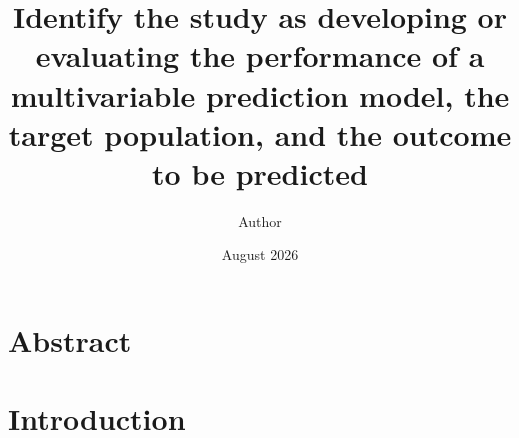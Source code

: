 \documentclass{article}
\title{Identify the study as developing or evaluating the performance of a multivariable prediction model, the target population, and the outcome to be predicted}%
\author{Author }
\date{August 2026}
\begin{document}
\maketitle


\section{Abstract}
\label{sec:abstract}










\section{Introduction}\label{sec:introduction}
\end{document}
